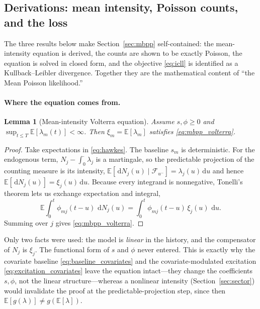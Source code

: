 \documentclass[11pt]{article}
\theoremstyle{plain}
\newtheorem{lemma}[proposition]{Lemma}
\theoremstyle{definition}
\theoremstyle{remark}
\newcommand{\E}{\mathbb{E}}
\newcommand{\dd}{\,\mathrm{d}}
\newcommand{\cF}{\mathcal{F}}
\begin{document}
\subsection{Derivations: mean intensity, Poisson counts, and the loss}
\label{sec:mbpp_derivations}
The three results below make Section~\ref{sec:mbpp} self-contained: the mean-intensity equation is derived, the counts are shown to be exactly Poisson, the equation is solved in closed form, and the objective \eqref{eq:icll} is identified as a Kullback--Leibler divergence. Together they are the mathematical content of ``the Mean Poisson likelihood.''

\paragraph{Where the equation comes from.}
\begin{lemma}[Mean-intensity Volterra equation]
\label{lem:mean}
Assume $s,\phi\ge0$ and $\sup_{t\le T}\E[\lambda_m(t)]<\infty$. Then $\xi_m=\E[\lambda_m]$ satisfies \eqref{eq:mbpp_volterra}.
\end{lemma}
\begin{proof}
Take expectations in \eqref{eq:hawkes}. The baseline $s_m$ is deterministic. For the endogenous term, $N_j-\int_0^\cdot\lambda_j$ is a martingale, so the predictable projection of the counting measure is its intensity, $\E[\dd N_j(u)\mid\cF_{u^-}]=\lambda_j(u)\dd u$ and hence $\E[\dd N_j(u)]=\xi_j(u)\dd u$. Because every integrand is nonnegative, Tonelli's theorem lets us exchange expectation and integral,
\[
\E\!\int_0^{t}\phi_{mj}(t-u)\,\dd N_j(u)=\int_0^{t}\phi_{mj}(t-u)\,\xi_j(u)\,\dd u .
\]
Summing over $j$ gives \eqref{eq:mbpp_volterra}.
\end{proof}
Only two facts were used: the model is \emph{linear} in the history, and the compensator of $N_j$ is $\xi_j$. The functional form of $s$ and $\phi$ never entered. This is exactly why the covariate baseline \eqref{eq:baseline_covariates} and the covariate-modulated excitation \eqref{eq:excitation_covariates} leave the equation intact---they change the coefficients $s,\phi$, not the linear structure---whereas a nonlinear intensity (Section~\ref{sec:sector}) would invalidate the proof at the predictable-projection step, since then $\E[g(\lambda)]\neq g(\E[\lambda])$.
\end{document}
